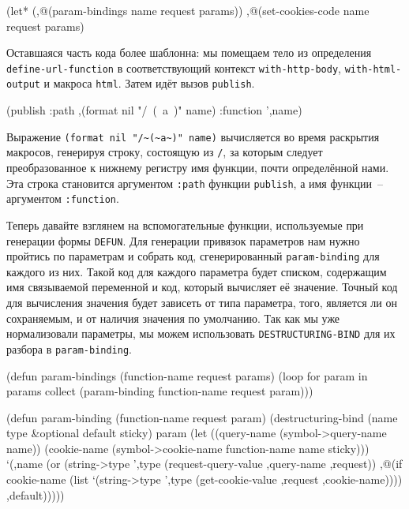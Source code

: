 \begin{myverb}
(let* (,@(param-bindings name request params))
  ,@(set-cookies-code name request params)
\end{myverb}

Оставшаяся часть кода более шаблонна: мы помещаем тело из определения
\lstinline{define-url-function} в соответствующий контекст \lstinline{with-http-body},
\lstinline{with-html-output} и макроса \lstinline{html}. Затем идёт вызов \lstinline{publish}.

\begin{myverb}
(publish :path ,(format nil "/~(~a~)" name) :function ',name)
\end{myverb}

Выражение \lstinline!(format nil "/~(~a~)" name)! вычисляется во время раскрытия макросов,
генерируя строку, состоящую из \lstinline{/}, за которым следует преобразованное к нижнему
регистру имя функции, почти определённой нами. Эта строка становится аргументом
\lstinline{:path} функции \lstinline{publish}, а имя функции~-- аргументом \lstinline{:function}.

Теперь давайте взглянем на вспомогательные функции, используемые при генерации формы
\lstinline{DEFUN}. Для генерации привязок параметров нам нужно пройтись по параметрам и
собрать код, сгенерированный \lstinline{param-binding} для каждого из них. Такой код для
каждого параметра будет списком, содержащим имя связываемой переменной и код, который
вычисляет её значение. Точный код для вычисления значения будет зависеть от типа
параметра, того, является ли он сохраняемым, и от наличия значения по умолчанию. Так как
мы уже нормализовали параметры, мы можем использовать \lstinline{DESTRUCTURING-BIND} для их
разбора в \lstinline{param-binding}.

\begin{myverb}
(defun param-bindings (function-name request params)
  (loop for param in params
     collect (param-binding function-name request param)))

(defun param-binding (function-name request param)
  (destructuring-bind (name type &optional default sticky) param
    (let ((query-name (symbol->query-name name))
          (cookie-name (symbol->cookie-name function-name name sticky)))
      `(,name (or 
               (string->type ',type (request-query-value ,query-name ,request))
               ,@(if cookie-name
                     (list `(string->type ',type (get-cookie-value ,request ,cookie-name))))
               ,default)))))
\end{myverb}

